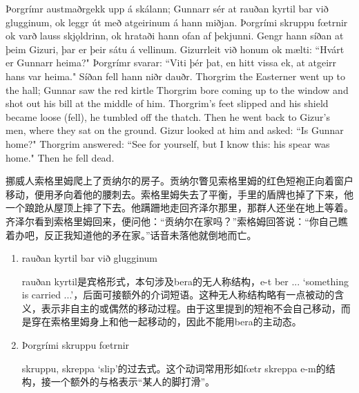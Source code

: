\begin{paracol}{2}
  Þorgrímr austmaðr\footnotemark gekk upp á skálann; Gunnarr sér at rauðan kyrtil bar við glugginum, ok leggr út með atgeirinum á hann miðjan. 
  Þorgrími skruppu fœtrnir ok varð lauss skjǫldrinn, ok hrataði hann ofan af þekjunni. Gengr hann síðan at þeim Gizuri, þar er þeir sátu á vellinum. Gizurr\footnotemark leit við honum ok mælti: ``Hvárt er Gunnarr heima?" Þorgrímr svarar: ``Viti þér þat, en hitt vissa ek, at atgeirr hans var heima." Síðan fell hann niðr dauðr.
  \switchcolumn
  Thorgrim the Easterner went up to the hall; Gunnar saw the red kirtle Thorgrim bore coming up to the window and shot out his bill at the middle of him. Thorgrim's feet slipped and his shield became loose (fell), he tumbled off the thatch. Then he went back to Gizur's men, where they sat on the ground. Gizur looked at him and asked: ``Is Gunnar home?" Thorgrim answered: ``See for yourself, but I know this: his spear was home." Then he fell dead.
\end{paracol}
\begin{translation*}{}
  挪威人索格里姆爬上了贡纳尔的房子。贡纳尔瞥见索格里姆的红色短袍正向着窗户移动，便用矛向着他的腰刺去。索格里姆失去了平衡，手里的盾牌也掉了下来，他一个踉跄从屋顶上摔了下去。他蹒跚地走回齐泽尔那里，那群人还坐在地上等着。齐泽尔看到索格里姆回来，便问他：“贡纳尔在家吗？”索格姆回答说：“你自己瞧着办吧，反正我知道他的矛在家。”话音未落他就倒地而亡。
\end{translation*}
\begin{grammar*}{}
  \begin{enumerate}[leftmargin=*]
    \item rauðan kyrtil bar við glugginum

          rauðan kyrtil是宾格形式，本句涉及bera的无人称结构，e-t ber ... `something is carried ...'，后面可接额外的介词短语。这种无人称结构略有一点被动的含义，表示非自主的或偶然的移动过程。由于这里提到的短袍不会自己移动，而是穿在索格里姆身上和他一起移动的，因此不能用bera的主动态。

    \item Þorgrími skruppu fœtrnir

          skruppu, skreppa `slip'的过去式。这个动词常用形如fœtr skreppa e-m的结构，接一个额外的与格表示“某人的脚打滑”。
  \end{enumerate}
\end{grammar*}
